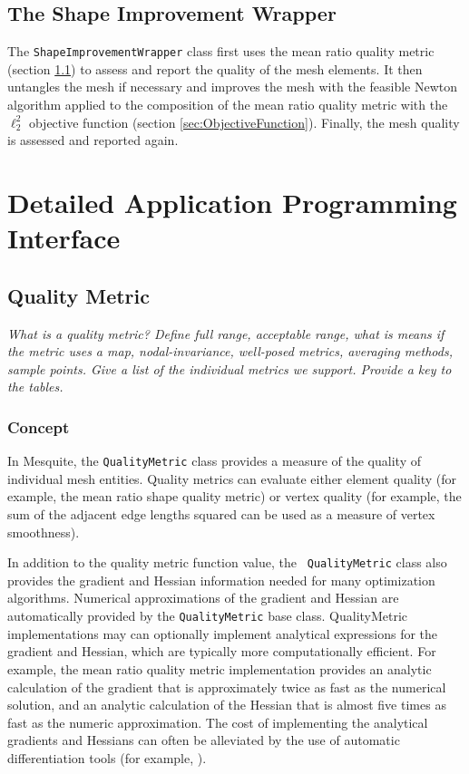 \subsection{The Shape Improvement Wrapper}

The \texttt{ShapeImprovementWrapper} class 
first uses the mean ratio quality
metric (section \ref{sec:QualityMetric}) to assess and report the quality of the mesh elements. It then
untangles the mesh if necessary and improves the mesh with the
feasible Newton algorithm applied to the composition of the mean ratio
quality metric with the $\ell_2^2$ objective function (section \ref{sec:ObjectiveFunction}). Finally, the
mesh quality is assessed and reported again. 


\section{Detailed Application Programming Interface}
\label{sec:detailedAPI}

\subsection{Quality Metric} \label{sec:QualityMetric}

{\it 
What is a quality metric? Define full range, acceptable range, what is means 
if the metric uses a map, nodal-invariance, well-posed metrics, averaging 
methods, sample points. Give a list of the individual metrics we support. 
Provide a key to the tables.
}

\subsubsection{Concept}

In Mesquite, the \texttt{QualityMetric} class provides a measure of
the quality of individual mesh entities.  Quality metrics can evaluate
either element quality (for example, the mean ratio shape quality
metric) or vertex quality (for example, the sum of the adjacent edge
lengths squared can be used as a measure of vertex smoothness).  

In addition to the quality metric function value, the {\tt
QualityMetric} class also provides the gradient and Hessian
information needed for many optimization algorithms.  Numerical
approximations of the gradient and Hessian are automatically provided
by the \texttt{QualityMetric} base class.  QualityMetric implementations
may can optionally
implement analytical expressions for the gradient and Hessian, which are 
typically more computationally efficient.  For example, the mean ratio
quality metric implementation provides an analytic calculation of the gradient 
that is approximately twice as fast as the numerical solution, and an analytic
calculation of the Hessian that is almost five times as fast as the
numeric approximation.  The
cost of implementing the analytical gradients and Hessians can often
be alleviated by the use of automatic differentiation tools
(for example, \cite{bischofadic}).

